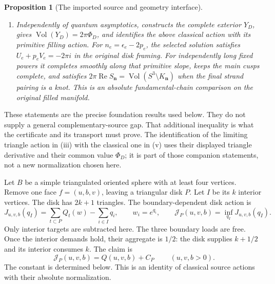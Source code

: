 \documentclass[11pt]{article}
\numberwithin{equation}{section}
\newtheorem{proposition}[theorem]{Proposition}
\theoremstyle{definition}\newtheorem{definition}[theorem]{Definition}
\theoremstyle{remark}\newtheorem{remark}[theorem]{Remark}
\begin{document}
\begin{proposition}[The imported source and geometry interface]
\begin{enumerate}[label=\textup{(\roman*)},leftmargin=*]
its value \(S_{N,\mathbf1}\) converges to \(S_{\boldsymbol n}\).
The remaining prefactor is nonzero and subexponential. Thus
\[
\lim_{N\to\infty}\frac1N\log
\left|(\bigotimes_e\mathcal L_N^{n_e})C_{D,N}\right|
=\operatorname{Re}S_{\boldsymbol n},\qquad
\operatorname{Re}S_{\boldsymbol n}\longrightarrow\Phi_D
\quad(\min_e|n_e|\to\infty).
\]
Both limits retain the original parity phases; no unsigned Fourier
replacement is made.
\item Independently of quantum asymptotics,
\cite[Proposition 2.1, Section 2.3 and Theorem 1.1]{Marked} constructs
the complete exterior \(Y_D\), gives
\(\operatorname{Vol}(Y_D)=2\pi\Phi_D\), and identifies the above
classical action with its primitive filling action. For
\(n_e=\epsilon_e-2p_e\), the selected solution satisfies
\(U_e+p_eV_e=-2\pi i\) in the original disk framing.
For independently long fixed powers it completes smoothly along
that primitive slope, keeps the main cusps complete, and satisfies
\(2\pi\operatorname{Re}S_{\boldsymbol n}
=\operatorname{Vol}(S^3\setminus K_{\boldsymbol n})\)
when the final strand pairing is a knot. This is an absolute
fundamental-chain comparison on the original filled manifold.
\end{enumerate}
\end{proposition}

These statements are the precise foundation results used below.
They do not supply a general complementary-source gap. That additional
inequality is what the certificate and its transport must prove.
The identification of the limiting triangle action in (iii) with the
classical one in (v) uses their displayed triangle derivative and their
common value \(\Phi_D\); it is part of those companion statements,
not a new normalization chosen here.

Let \(B\) be a simple triangulated oriented sphere with at least four vertices. Remove one face \(f=(u,b,v)\), leaving a triangular disk \(P\). Let \(I\) be its \(k\) interior vertices. The disk has \(2k+1\) triangles. The boundary-dependent disk action is
\begin{equation}\label{ti:eq-2}
J_{u,v,b}(q_I)=\sum_{t\subset P}Q_t(w)-\sum_{i\in I}q_i,
\qquad w_i=e^{q_i},\qquad
\mathcal J_P(u,v,b)=\inf_{q_I}J_{u,v,b}(q_I).
\end{equation}
Only interior targets are subtracted here. The three boundary loads
are free. Once the interior demands hold, their aggregate is \(1/2\):
the disk supplies \(k+1/2\) and its interior consumes \(k\). The claim is
\begin{equation}\label{ti:eq-3}
\boxed{\ \mathcal J_P(u,v,b)=Q(u,v,b)+C_P\ }\qquad(u,v,b>0).
\end{equation}
The constant is determined below. This is an identity of classical source actions with their absolute normalization.
\end{document}
